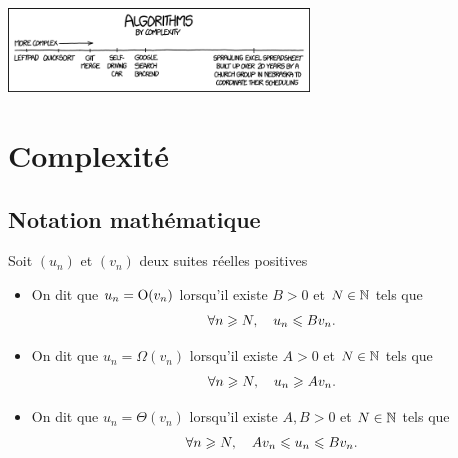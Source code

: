 \documentclass{magnolia}
\begin{document}
\hfill\includegraphics[width=0.6\textwidth]{../../Commun/Images/python-cours-algorithms}
\magtoc

\section{Complexité}
\subsection{Notation mathématique}

\begin{definition}
Soit $(u_n)$ et $(v_n)$ deux suites réelles positives
\begin{itemize}
  \item On dit que $u_n={\rm O}(v_n)$ lorsqu'il existe $B>0$ et $N\in\mathbb{N}$ tels que
    \[\forall n\geqslant N,\quad u_n \leqslant B v_n.\]
  \item On dit que $u_n=\Omega(v_n)$ lorsqu'il existe $A>0$ et $N\in\mathbb{N}$ tels que
    \[\forall n\geqslant N,\quad u_n \geqslant A v_n.\]
  \item On dit que $u_n=\Theta(v_n)$ lorsqu'il existe $A,B>0$ et $N\in\mathbb{N}$ tels que
    \[\forall n\geqslant N,\quad A v_n \leqslant u_n \leqslant B v_n.\]
\end{itemize}
\end{definition}
\end{document}
